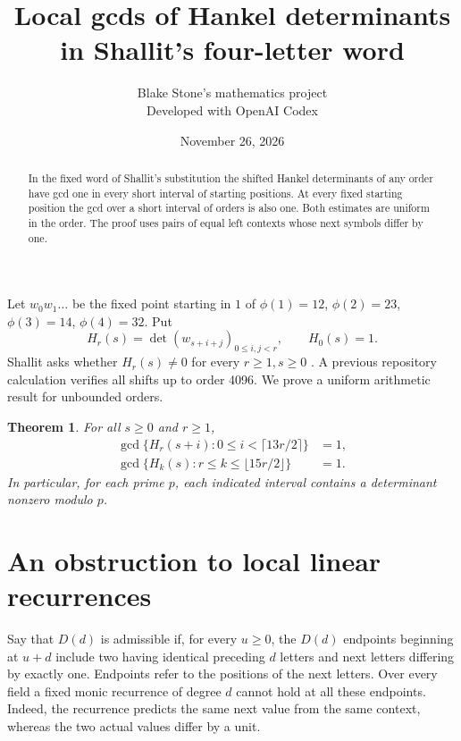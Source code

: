 \documentclass[11pt]{article}
\title{Local gcds of Hankel determinants in Shallit's four-letter word}
\author{Blake Stone's mathematics project\\\small Developed with OpenAI Codex}
\date{November 26, 2026}
\newtheorem{theorem}{Theorem}
\begin{document}
\maketitle
\begin{abstract}
In the fixed word of Shallit's substitution the shifted Hankel determinants of any order have gcd one in every short interval of starting positions. At every fixed starting position the gcd over a short interval of orders is also one. Both estimates are uniform in the order. The proof uses pairs of equal left contexts whose next symbols differ by one.
\end{abstract}
Let $w_0w_1\ldots$ be the fixed point starting in $1$ of
$\phi(1)=12$, $\phi(2)=23$, $\phi(3)=14$, $\phi(4)=32$. Put
\[
 H_r(s)=\det(w_{s+i+j})_{0\le i,j<r},\qquad H_0(s)=1.
\]
Shallit asks whether $H_r(s)\ne0$ for every $r\ge1,s\ge0$ \cite{shallit,slides}. A previous repository calculation verifies all shifts up to order 4096. We prove a uniform arithmetic result for unbounded orders.

\begin{theorem}\label{main}
For all $s\ge0$ and $r\ge1$,
\begin{align*}
 \gcd\{H_r(s+i):0\le i<\lceil13r/2\rceil\}&=1,\\
 \gcd\{H_k(s):r\le k\le\lfloor15r/2\rfloor\}&=1 .
\end{align*}
In particular, for each prime $p$, each indicated interval contains a determinant nonzero modulo $p$.
\end{theorem}

\section{An obstruction to local linear recurrences}
Say that $D(d)$ is admissible if, for every $u\ge0$, the $D(d)$ endpoints beginning at $u+d$ include two having identical preceding $d$ letters and next letters differing by exactly one. Endpoints refer to the positions of the next letters. Over every field a fixed monic recurrence of degree $d$ cannot hold at all these endpoints. Indeed, the recurrence predicts the same next value from the same context, whereas the two actual values differ by a unit.
\end{document}
